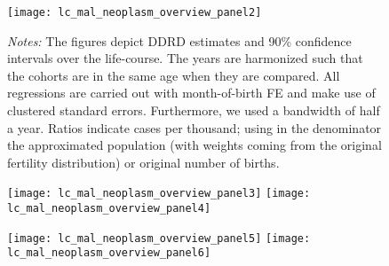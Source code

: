 \begin{landscape}
\begin{figure}[H]
\centering
\begin{minipage}{.9\linewidth}
\texttt{[image: lc\_mal\_neoplasm\_overview\_panel2]}
{\scriptsize \emph{Notes:} The figures depict DDRD estimates and 90\% confidence intervals over the life-course. The years are harmonized such that the cohorts are in the same age when they are compared. All regressions are carried out with month-of-birth FE and make use of clustered standard errors. Furthermore, we used a bandwidth of half a year. Ratios indicate cases per thousand; using in the denominator the approximated population (with weights coming from the original fertility distribution) or original number of births. \par}
\end{minipage}
\end{figure}
\end{landscape}
\begin{figure}[H]%
	\centering
	\texttt{[image: lc\_mal\_neoplasm\_overview\_panel3]}
	\texttt{[image: lc\_mal\_neoplasm\_overview\_panel4]}
\end{figure}
\begin{figure}[H]
	\centering	
	\texttt{[image: lc\_mal\_neoplasm\_overview\_panel5]}
	\texttt{[image: lc\_mal\_neoplasm\_overview\_panel6]}
\end{figure}
